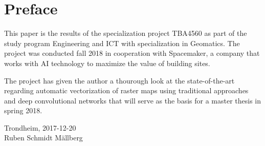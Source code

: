 \section*{Preface}
This paper is the results of the specialization project TBA4560 as part of the study program Engineering and ICT with specialization in Geomatics. The project was conducted fall 2018 in cooperation with Spacemaker, a company that works with AI technology to maximize the value of building sites. 

The project has given the author a thourough look at the state-of-the-art regarding automatic vectorization of raster maps using traditional approaches and deep convolutional networks that will serve as the basis for a master thesis in spring 2018.

\begin{center}
Trondheim, 2017-12-20\\[1pc]
Ruben Schmidt Mällberg
\end{center}
